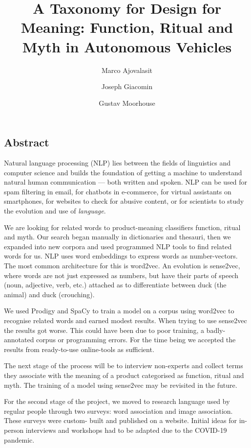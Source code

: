 \documentclass[12pt, usenames, dvipsnames]{report}
\title {A Taxonomy for Design for Meaning: Function, Ritual and Myth in Autonomous Vehicles}
\date{November 2020

to be submitted for publication}
\author[1]{Marco Ajovalasit}
\affil[1]{Department of Design, Politecnico di Milano}
\author[2]{Joseph Giacomin}
\affil[2]{Human Centred Design, Brunel University}
\author[3]{Gustav Moorhouse}
\affil[3]{Department of Design, Politecnico di Milano}
\begin{document}
\maketitle

\begin{flushleft}

\section*{Abstract}
Natural language processing (NLP) lies between the fields of linguistics and computer science and builds the foundation of getting a machine to understand natural human communication --- both written and spoken. 
NLP can be used for spam filtering in email, for chatbots in e-commerce, for virtual assistants on smartphones, for websites to check for abusive content, or for scientists to study the evolution and use of \emph{language}.

We are looking for related words to product-meaning classifiers function, ritual and myth.
Our search began manually in dictionaries and thesauri, then we expanded into new corpora and used programmed NLP tools to find related words for us.
NLP uses word embeddings to express words as number-vectors. 
The most common architecture for this is word2vec. 
An evolution is sense2vec, where words are not just expressed as numbers, but have their parts of speech (noun, adjective, verb, etc.) attached as to differentiate between duck (the animal) and duck (crouching). 

We used Prodigy and SpaCy to train a model on a corpus using word2vec to recognise related words and earned modest results.
When trying to use sense2vec the results got worse.
This could have been due to poor training, a badly-annotated corpus or programming errors.
For the time being we accepted the results from ready-to-use online-tools as sufficient.

The next stage of the process will be to interview non-experts and collect terms they associate with the meaning of a product categorised as function, ritual and myth.
The training of a model using sense2vec may be revisited in the future.

For the second stage of the project, we moved to research language used by regular people through two surveys: word association and image association.
These surveys were custom- built and published on a website.
Initial ideas for in-person interviews and workshops had to be adapted due to the COVID-19 pandemic.


\end{flushleft}
\end{document}
